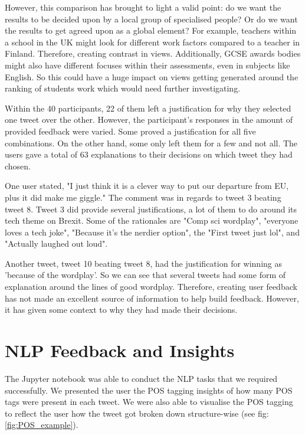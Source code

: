 	However, this comparison has brought to light a valid point: do we want the results to be decided upon by a local group of specialised people? Or do we want the results to get agreed upon as a global element? For example, teachers within a school in the UK might look for different work factors compared to a teacher in Finland. Therefore, creating contrast in views. Additionally, GCSE awards bodies might also have different focuses within their assessments, even in subjects like English. So this could have a huge impact on views getting generated around the ranking of students work which would need further investigating.

	Within the 40 participants, 22 of them left a justification for why they selected one tweet over the other. However, the participant's responses in the amount of provided feedback were varied. Some proved a justification for all five combinations. On the other hand, some only left them for a few and not all. The users gave a total of 63 explanations to their decisions on which tweet they had chosen.
	
	One user stated, "I just think it is a clever way to put our departure from EU, plus it did make me giggle." The comment was in regards to tweet 3 beating tweet 8. Tweet 3 did provide several justifications, a lot of them to do around its tech theme on Brexit. Some of the rationales are "Comp sci wordplay", "everyone loves a tech joke", "Because it's the nerdier option", the "First tweet just lol", and "Actually laughed out loud".
	
	Another tweet, tweet 10 beating tweet 8, had the justification for winning as 'because of the wordplay'. So we can see that several tweets had some form of explanation around the lines of good wordplay. Therefore, creating user feedback has not made an excellent source of information to help build feedback. However, it has given some context to why they had made their decisions.


\section{NLP Feedback and Insights}
\label{sec:reaults_NLP}
	
	The Jupyter notebook was able to conduct the NLP tasks that we required successfully. We presented the user the POS tagging insights of how many POS tags were present in each tweet. We were also able to visualise the POS tagging to reflect the user how the tweet got broken down structure-wise (see fig: \ref{fig:POS_example}).
	
